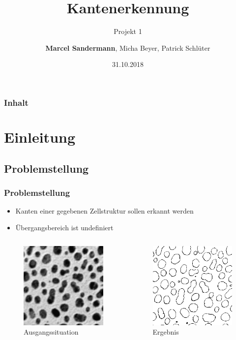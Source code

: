 \documentclass[12pt]{beamer}
\begin{document}
	\author[Gruppe D]{\textbf{Marcel Sandermann}, Micha Beyer, Patrick Schlüter}
	\title{Kantenerkennung}
	\subtitle{Projekt 1}
	\date{31.10.2018}
	
	
\begin{frame}
	\titlepage
\end{frame}

\begin{frame}
	\frametitle{Inhalt}
	\tableofcontents	
\end{frame}

\section{Einleitung}
\subsection{Problemstellung}
\begin{frame}
	\frametitle{Problemstellung}
	\begin{itemize}
		\item Kanten einer gegebenen Zellstruktur sollen erkannt werden
		\item Übergangsbereich ist undefiniert		
	\end{itemize}
	\begin{columns}[c]
		\begin{figure}
		\includegraphics[width=0.5\linewidth]{Anfang.png}
		\caption{Ausgangssituation}	
		\end{figure}
		\begin{figure}
			\includegraphics[width=0.5\linewidth]{Ergebnis.png}
			\caption{Ergebnis}
		\end{figure}		 	
	\end{columns}	
\end{frame}
\end{document}
